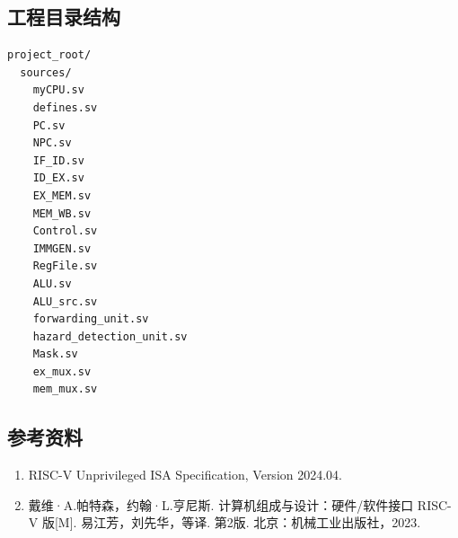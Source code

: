 \documentclass[UTF8,a4paper,12pt]{ctexart}
\begin{document}
\subsection{工程目录结构}

\begin{verbatim}
project_root/
  sources/
    myCPU.sv
    defines.sv
    PC.sv
    NPC.sv
    IF_ID.sv
    ID_EX.sv
    EX_MEM.sv
    MEM_WB.sv
    Control.sv
    IMMGEN.sv
    RegFile.sv
    ALU.sv
    ALU_src.sv
    forwarding_unit.sv
    hazard_detection_unit.sv
    Mask.sv
    ex_mux.sv
    mem_mux.sv

\end{verbatim}

\subsection{参考资料}

\begin{enumerate}
    \item RISC-V Unprivileged ISA Specification, Version 2024.04.
    \item 戴维·A.帕特森，约翰·L.亨尼斯. 计算机组成与设计：硬件/软件接口 RISC-V 版[M]. 易江芳，刘先华，等译. 第2版. 北京：机械工业出版社，2023.

\end{enumerate}
\end{document}

